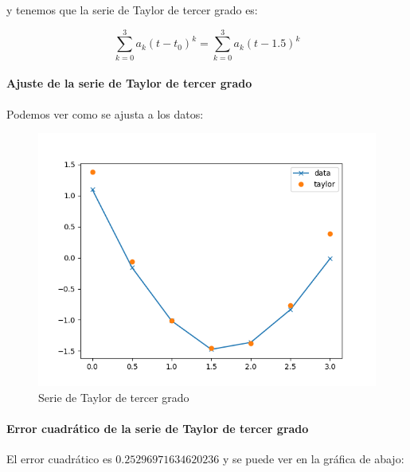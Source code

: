 y tenemos que la serie de Taylor de tercer grado es: 

$$
\sum_{k=0}^{3} a_k (t - t_0)^k = \sum_{k=0}^{3} a_k (t - 1.5)^k
$$

\newpage 

\paragraph{Ajuste de la serie de Taylor de tercer grado}
Podemos ver como se ajusta a los datos:

\begin{figure}[H]
	\includegraphics[width=\linewidth]{figures/taylor_expansion.png}
	\caption{Serie de Taylor de tercer grado}
	\label{fig:taylor_3rd_deg}
\end{figure}

\newpage 

\paragraph{Error cuadrático de la serie de Taylor de tercer grado}

El error cuadrático es $0.25296971634620236$ y se puede ver en la gráfica de abajo: 


